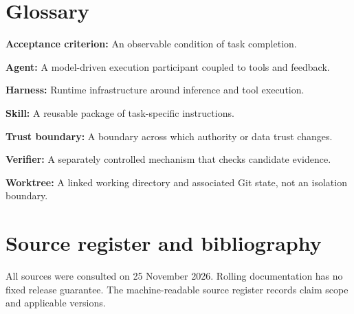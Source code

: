 \documentclass[11pt,oneside,openany]{book}
\begin{document}
\chapter{Glossary}

\textbf{Acceptance criterion:} An observable condition of task completion.\par\textbf{Agent:} A model-driven execution participant coupled to tools and feedback.\par\textbf{Harness:} Runtime infrastructure around inference and tool execution.\par\textbf{Skill:} A reusable package of task-specific instructions.\par\textbf{Trust boundary:} A boundary across which authority or data trust changes.\par\textbf{Verifier:} A separately controlled mechanism that checks candidate evidence.\par\textbf{Worktree:} A linked working directory and associated Git state, not an isolation boundary.

\chapter{Source register and bibliography}

All sources were consulted on 25 November 2026. Rolling documentation has no fixed release guarantee. The machine-readable source register records claim scope and applicable versions.
\end{document}
